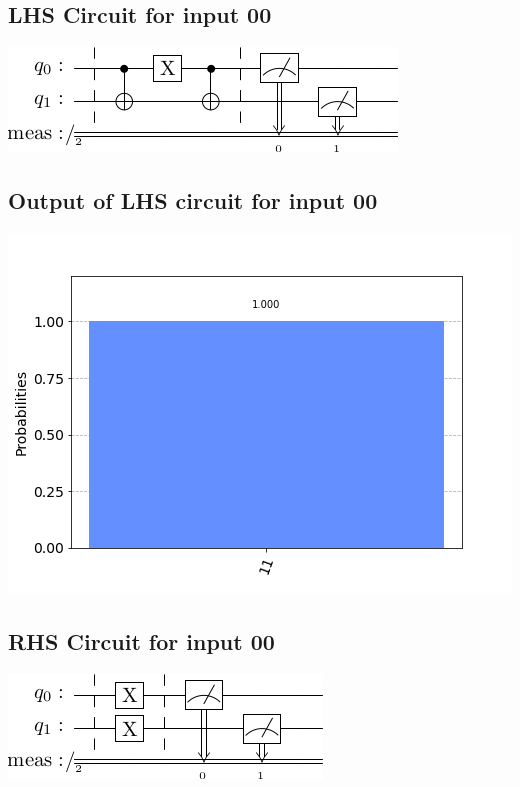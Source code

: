\documentclass[a4paper]{article}
\begin{document}
    \begin{answer}[Question 1 b (a)]
        \subsection*{LHS Circuit for input 00}
        \includegraphics[scale=0.5]{a100.png}
        \subsection*{Output of LHS circuit for input 00}
        \includegraphics[scale = 0.5]{a100-out.png}
        \subsection*{RHS Circuit for input 00}
        \includegraphics[scale=0.5]{a200.png}

\end{answer}
\end{document}
